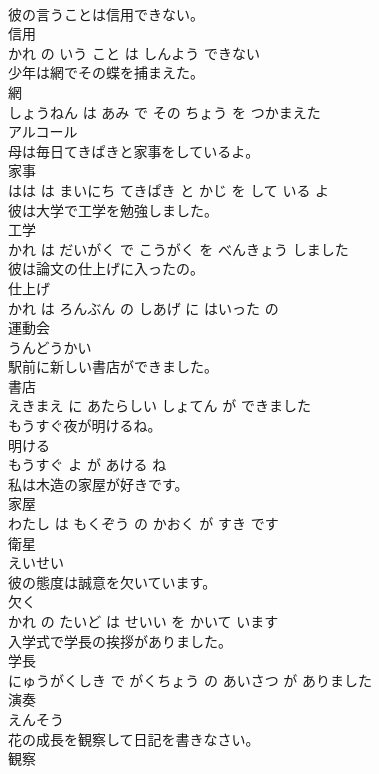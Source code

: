 \documentclass[8pt]{extreport}
\begin{document}
\begin{CJK}{UTF8}{min}
\\	彼の言うことは信用できない。	
\\	信用 
\\	かれ の いう こと は しんよう できない			
\\	少年は網でその蝶を捕まえた。	
\\	網 
\\	しょうねん は あみ で その ちょう を つかまえた			
\\	アルコール	
\\	母は毎日てきぱきと家事をしているよ。	
\\	家事 
\\	はは は まいにち てきぱき と かじ を して いる よ			
\\	彼は大学で工学を勉強しました。	
\\	工学 
\\	かれ は だいがく で こうがく を べんきょう しました			
\\	彼は論文の仕上げに入ったの。	
\\	仕上げ 
\\	かれ は ろんぶん の しあげ に はいった の			
\\	運動会	
\\	うんどうかい		
\\	駅前に新しい書店ができました。	
\\	書店 
\\	えきまえ に あたらしい しょてん が できました			
\\	もうすぐ夜が明けるね。	
\\	明ける 
\\	もうすぐ よ が あける ね			
\\	私は木造の家屋が好きです。	
\\	家屋 
\\	わたし は もくぞう の かおく が すき です			
\\	衛星	
\\	えいせい		
\\	彼の態度は誠意を欠いています。	
\\	欠く 
\\	かれ の たいど は せいい を かいて います			
\\	入学式で学長の挨拶がありました。	
\\	学長 
\\	にゅうがくしき で がくちょう の あいさつ が ありました			
\\	演奏	
\\	えんそう		
\\	花の成長を観察して日記を書きなさい。	
\\	観察 

\end{CJK}
\end{document}
